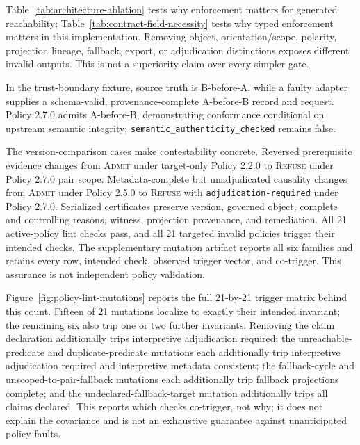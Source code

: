 \documentclass[manuscript,screen,review]{acmart}
\begin{document}


Table~\ref{tab:architecture-ablation} tests why enforcement matters for generated reachability; Table~\ref{tab:contract-field-necessity} tests why typed enforcement matters in this implementation. Removing object, orientation/scope, polarity, projection lineage, fallback, export, or adjudication distinctions exposes different invalid outputs. This is not a superiority claim over every simpler gate.

In the trust-boundary fixture, source truth is B-before-A, while a faulty adapter supplies a schema-valid, provenance-complete A-before-B record and request. Policy 2.7.0 admits A-before-B, demonstrating conformance conditional on upstream semantic integrity; \texttt{semantic\_authenticity\_checked} remains false.

The version-comparison cases make contestability concrete. Reversed prerequisite evidence changes from \textsc{Admit} under target-only Policy 2.2.0 to \textsc{Refuse} under Policy 2.7.0 pair scope. Metadata-complete but unadjudicated causality changes from \textsc{Admit} under Policy 2.5.0 to \textsc{Refuse} with \texttt{adjudication-required} under Policy 2.7.0. Serialized certificates preserve version, governed object, complete and controlling reasons, witness, projection provenance, and remediation. All 21 active-policy lint checks pass, and all 21 targeted invalid policies trigger their intended checks. The supplementary mutation artifact reports all six families and retains every row, intended check, observed trigger vector, and co-trigger. This assurance is not independent policy validation.

Figure~\ref{fig:policy-lint-mutations} reports the full 21-by-21 trigger matrix behind this count. Fifteen of 21 mutations localize to exactly their intended invariant; the remaining six also trip one or two further invariants. Removing the claim declaration additionally trips interpretive adjudication required; the unreachable-predicate and duplicate-predicate mutations each additionally trip interpretive adjudication required and interpretive metadata consistent; the fallback-cycle and unscoped-to-pair-fallback mutations each additionally trip fallback projections complete; and the undeclared-fallback-target mutation additionally trips all claims declared. This reports which checks co-trigger, not why; it does not explain the covariance and is not an exhaustive guarantee against unanticipated policy faults.
\end{document}
